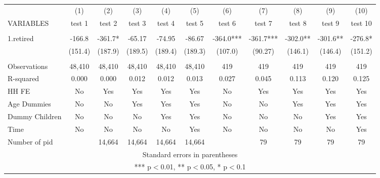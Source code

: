 \begin{tabular}{lcccccccccc} \hline
 & (1) & (2) & (3) & (4) & (5) & (6) & (7) & (8) & (9) & (10) \\
VARIABLES & test 1 & test 2 & test 3 & test 4 & test 5 & test 6 & test 7 & test 8 & test 9 & test 10 \\ \hline
 &  &  &  &  &  &  &  &  &  &  \\
1.retired & -166.8 & -361.7* & -65.17 & -74.95 & -86.67 & -364.0*** & -361.7*** & -302.0** & -301.6** & -276.8* \\
 & (151.4) & (187.9) & (189.5) & (189.4) & (189.3) & (107.0) & (90.27) & (146.1) & (146.4) & (151.2) \\
 &  &  &  &  &  &  &  &  &  &  \\
Observations & 48,410 & 48,410 & 48,410 & 48,410 & 48,410 & 419 & 419 & 419 & 419 & 419 \\
R-squared & 0.000 & 0.000 & 0.012 & 0.012 & 0.013 & 0.027 & 0.045 & 0.113 & 0.120 & 0.125 \\
HH FE & No & Yes & Yes & Yes & Yes & No & Yes & Yes & Yes & Yes \\
Age Dummies & No & No & Yes & Yes & Yes & No & No & Yes & Yes & Yes \\
Dummy Children & No & No & No & Yes & Yes & No & No & No & Yes & Yes \\
Time & No & No & No & No & Yes & No & No & No & No & Yes \\
 Number of pid &  & 14,664 & 14,664 & 14,664 & 14,664 &  & 79 & 79 & 79 & 79 \\ \hline
\multicolumn{11}{c}{ Standard errors in parentheses} \\
\multicolumn{11}{c}{ *** p$<$0.01, ** p$<$0.05, * p$<$0.1} \\
\end{tabular}
